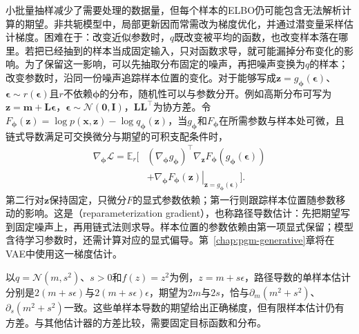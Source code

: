 小批量抽样减少了需要处理的数据量，但每个样本的ELBO仍可能包含无法解析计算的期望。非共轭模型中，局部更新因而常需改为梯度优化，并通过潜变量采样估计梯度。困难在于：改变近似参数时，$q$既改变被平均的函数，也改变样本落在哪里。若把已经抽到的样本当成固定输入，只对函数求导，就可能漏掉分布变化的影响。为了保留这一影响，可以先抽取分布固定的噪声，再把噪声变换为$q$的样本；改变参数时，沿同一份噪声追踪样本位置的变化。对于能够写成$\bm z=g_{\bm{\phi}}(\bm\epsilon)$、$\bm\epsilon\sim r(\bm\epsilon)$且$r$不依赖$\bm{\phi}$的分布，随机性可以与参数分开。例如高斯分布可写为$\bm z=\bm m+\bm L\bm\epsilon$，$\bm\epsilon\sim\mathcal N(\bm0,\bm I)$，$\bm L\bm L^\top$为协方差。令$F_{\bm{\phi}}(\bm z)=\log p(\bm x,\bm z)-\log q_{\bm{\phi}}(\bm z)$，当$g_{\bm\phi}$和$F_{\bm\phi}$在所需参数与样本处可微，且链式导数满足可交换微分与期望的可积支配条件时，
\begin{equation}
  \begin{aligned}
    \nabla_{\bm{\phi}}\mathcal L
      =\mathbb E_r\big[
        &(\nabla_{\bm{\phi}}g_{\bm{\phi}})^\top
           \nabla_{\bm z}F_{\bm{\phi}}
                (g_{\bm{\phi}}(\bm\epsilon))\\
        &+\left.\nabla_{\bm{\phi}}F_{\bm{\phi}}(\bm z)
          \right|_{\bm z=g_{\bm{\phi}}(\bm\epsilon)}
        \big].
  \end{aligned}
  \label{eq:pgm-variational-pathwise}
\end{equation}
第二行对$\bm z$保持固定，只微分$F$的显式参数依赖；第一行则跟踪样本位置随参数移动的影响。这是（reparameterization gradient），也称路径导数估计：先把期望写到固定噪声上，再用链式法则求导。样本位置的参数依赖由第一项显式保留；模型含待学习参数时，还需计算对应的显式偏导。第~\ref{chap:pgm-generative}章将在VAE中使用这一梯度估计。

以$q=\mathcal N(m,s^2)$、$s>0$和$f(z)=z^2$为例，$z=m+s\epsilon$，路径导数的单样本估计分别是$2(m+s\epsilon)$与$2(m+s\epsilon)\epsilon$，期望为$2m$与$2s$，恰与$\partial_m(m^2+s^2)$、$\partial_s(m^2+s^2)$一致。这些单样本导数的期望给出正确梯度，但有限样本估计仍有方差。与其他估计器的方差比较，需要固定目标函数和分布。

